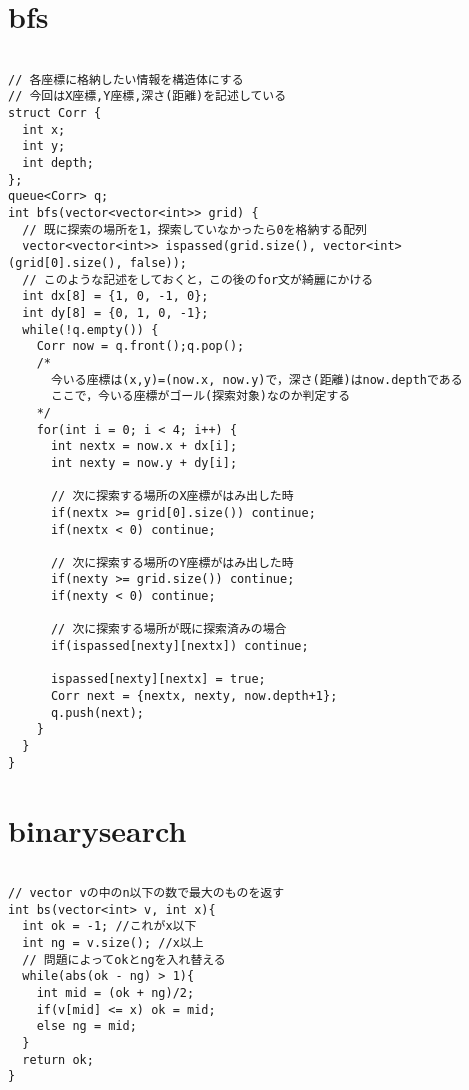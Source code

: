 \documentclass[a4j,titlepage]{jarticle} %
\begin{document}
\color{white}
\section{bfs}
\color{black}
\begin{lstlisting}[caption=bfs]

// 各座標に格納したい情報を構造体にする
// 今回はX座標,Y座標,深さ(距離)を記述している
struct Corr {
  int x;
  int y;
  int depth;
};
queue<Corr> q;
int bfs(vector<vector<int>> grid) {
  // 既に探索の場所を1，探索していなかったら0を格納する配列
  vector<vector<int>> ispassed(grid.size(), vector<int>(grid[0].size(), false));
  // このような記述をしておくと，この後のfor文が綺麗にかける
  int dx[8] = {1, 0, -1, 0};
  int dy[8] = {0, 1, 0, -1};
  while(!q.empty()) {
    Corr now = q.front();q.pop();
    /*
      今いる座標は(x,y)=(now.x, now.y)で，深さ(距離)はnow.depthである
      ここで，今いる座標がゴール(探索対象)なのか判定する
    */
    for(int i = 0; i < 4; i++) {
      int nextx = now.x + dx[i];
      int nexty = now.y + dy[i];

      // 次に探索する場所のX座標がはみ出した時
      if(nextx >= grid[0].size()) continue;
      if(nextx < 0) continue;

      // 次に探索する場所のY座標がはみ出した時
      if(nexty >= grid.size()) continue;
      if(nexty < 0) continue;

      // 次に探索する場所が既に探索済みの場合
      if(ispassed[nexty][nextx]) continue;

      ispassed[nexty][nextx] = true;
      Corr next = {nextx, nexty, now.depth+1};
      q.push(next);
    }
  }
}

\end{lstlisting}

\color{white}
\section{binarysearch}
\color{black}
\begin{lstlisting}[caption=binarysearch]

// vector vの中のn以下の数で最大のものを返す
int bs(vector<int> v, int x){
  int ok = -1; //これがx以下 
  int ng = v.size(); //x以上 
  // 問題によってokとngを入れ替える
  while(abs(ok - ng) > 1){
    int mid = (ok + ng)/2;
    if(v[mid] <= x) ok = mid;
    else ng = mid;
  }
  return ok;
}

\end{lstlisting}

\color{white}
\end{document}
